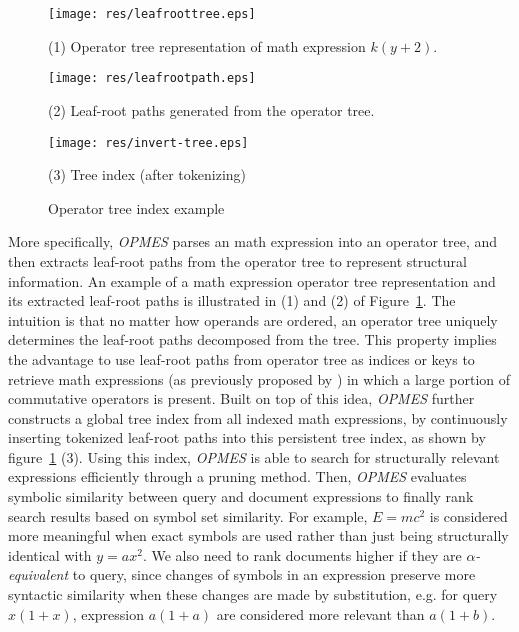 \documentclass{llncs}
\begin{document}
\begin{figure}

\begin{minipage}[b]{1.2in}
\begin{center}
\texttt{[image: res/leafroottree.eps]}
\end{center}
(1) Operator tree representation of math expression $k(y + 2)$.
\end{minipage}
\hspace*{0.3in}
\begin{minipage}[b]{1.2in}
\begin{center}
\texttt{[image: res/leafrootpath.eps]}
\end{center}
(2) Leaf-root paths generated from the operator tree.
\end{minipage}
\hspace*{0.3in}
\begin{minipage}[b]{1.4in}
\begin{center}
\texttt{[image: res/invert-tree.eps]}
\end{center}
(3) Tree index (after tokenizing)
\end{minipage}

\caption{Operator tree index example}\label{oprtreeExample}
\end{figure}
More specifically, 
{\em OPMES} parses an math expression into an operator tree, and then 
extracts leaf-root paths from the operator tree to represent structural information.
An example of a math expression operator tree representation and its extracted leaf-root paths 
is illustrated in (1) and (2) of Figure~\ref{oprtreeExample}.
The intuition is that no matter how operands are ordered, an operator tree uniquely determines 
the leaf-root paths decomposed from the tree. 
This property implies the advantage to use leaf-root paths from operator tree as indices or keys to retrieve math expressions (as previously proposed by \cite{signifjap,MathMLleafroot,signfused}) in which a large portion of commutative operators is present.
Built on top of this idea, {\em OPMES} further constructs a global tree index from all indexed math expressions,
by continuously inserting tokenized leaf-root paths into this persistent tree index, as shown by figure~\ref{oprtreeExample} (3).
Using this index, {\em OPMES} is able to search for structurally relevant expressions efficiently 
through a pruning method. 
Then, {\em OPMES} evaluates symbolic similarity between query and document expressions to finally rank search results based on symbol set similarity. 
For example, $E=mc^2$ is considered more meaningful when exact symbols are used rather than just being structurally identical with $y=ax^2$.
We also need to rank documents higher if they are \textit{$\alpha$-equivalent} to query,
since changes of symbols in an expression preserve more syntactic similarity when these changes are made by substitution, e.g. for query $x(1+x)$, expression $a(1+a)$ are considered more relevant than $a(1+b)$. 
\end{document}
